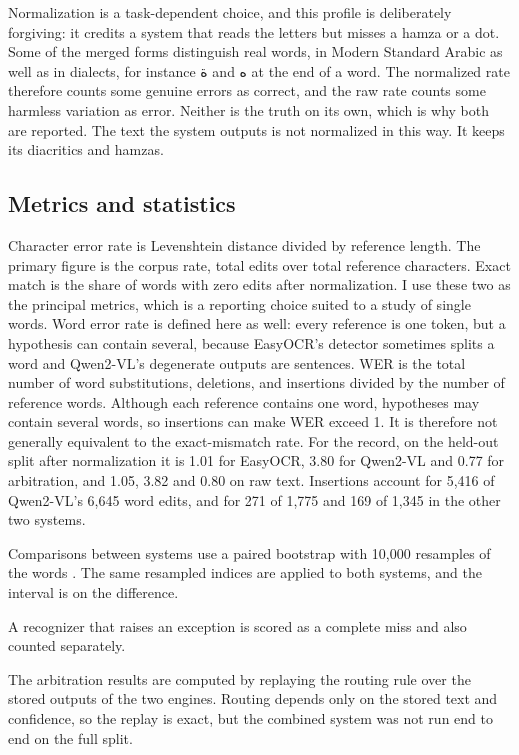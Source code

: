 \documentclass[11pt,a4paper]{article}
\newcommand{\ar}[1]{{\beginR\arabicfont #1\endR}}
\begin{document}
Normalization is a task-dependent choice, and this profile is deliberately
forgiving: it credits a system that reads the letters but misses a hamza or a
dot. Some of the merged forms distinguish real words, in Modern Standard
Arabic as well as in dialects, for instance \ar{ة} and \ar{ه} at the end of
a word. The normalized rate therefore counts some genuine errors as correct,
and the raw rate counts some harmless variation as error. Neither is the
truth on its own, which is why both are reported. The text the system
outputs is not normalized in this way. It keeps its diacritics and hamzas.

\subsection{Metrics and statistics}

Character error rate is Levenshtein distance \cite{levenshtein} divided by
reference length. The primary figure is the corpus rate, total edits over
total reference characters. Exact match is the share of words with zero
edits after normalization. I use these two as the principal metrics, which is
a reporting choice suited to a study of single words. Word error rate is
defined here as well: every reference is one token, but a hypothesis can
contain several, because EasyOCR's detector sometimes splits a word and
Qwen2-VL's degenerate outputs are sentences. WER is the total number of word
substitutions, deletions, and insertions divided by the number of reference
words. Although each reference contains one word, hypotheses may contain
several words, so insertions can make WER exceed 1. It is therefore not
generally equivalent to the exact-mismatch rate. For the record, on the
held-out split after normalization it is 1.01 for EasyOCR, 3.80 for Qwen2-VL
and 0.77 for arbitration, and 1.05, 3.82 and 0.80 on raw text. Insertions
account for 5,416 of Qwen2-VL's 6,645 word edits, and for 271 of 1,775 and
169 of 1,345 in the other two systems.

Comparisons between systems use a paired bootstrap with 10,000 resamples of
the words \cite{efron,koehn}. The same resampled indices are applied to both
systems, and the interval is on the difference.

A recognizer that raises an exception is scored as a complete miss and also
counted separately.

\label{sec:replay}
The arbitration results are computed by replaying the routing rule over the
stored outputs of the two engines. Routing depends only on the stored text and
confidence, so the replay is exact, but the combined system was not run end to
end on the full split.
\end{document}
